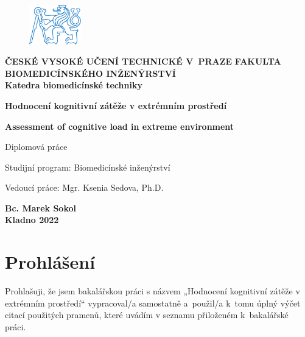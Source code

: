 \documentclass[a4paper,12pt,czech,oneside]{memoir}
\def\uv#1{„#1“}
\numberwithin{equation}{chapter}
\newcommand{\autor}{Bc. Marek Sokol}
\newcommand{\vedouci}{Mgr. Ksenia Sedova, Ph.D.}
\newcommand{\nazev}{Hodnocení kognitivní zátěže v extrémním prostředí}
\newcommand{\nazevENG}{Assessment of cognitive load in extreme environment}
\newcommand{\typ}{Diplomová práce}
\newcommand{\rok}{2022}
\newcommand{\program}{Biomedicínské inženýrství}
\newcommand{\fakulta}{FAKULTA BIOMEDICÍNSKÉHO INŽENÝRSTVÍ}
\newcommand{\cvut}{ČESKÉ VYSOKÉ UČENÍ TECHNICKÉ V~PRAZE}
\newcommand{\katedra}{Katedra biomedicínské techniky}
\begin{document}
\pagestyle{empty}
\begin{titlingpage}
	\begin{center}
		\begin{figure}[!h]
			\centering
			\includegraphics[width=0.2\textwidth]{symbol_cvut_konturova_verze}
		\end{figure}
		\textsf{\large{\textbf{\cvut}}}
		{\color{NavyBlue}\makebox[\linewidth]{\rule[.2\baselineskip]{\textwidth}{0.4mm}}}
		\textsf{\normalsize{\textbf{\fakulta}}}\\

		\textsf{\textbf{\katedra}}

		\vfill

		\textsf{\Large{\textbf{\nazev}}}

		\vspace{36pt}

		\textsf{\Large{\textbf{\nazevENG}}}

		\vspace{48pt}

		\textsf{\typ}

		\vfill

	\end{center}
	\textsf{Studijní program: \program}

	\vspace{12pt}

	\noindent\textsf{Vedoucí práce: \vedouci}

	\vspace{24pt}

	\begin{center}
		\textsf{\textbf{\autor}} \\ [0.5cm]
		{\color{NavyBlue}\makebox[\linewidth]{\rule{\textwidth}{0.4mm}}}
		\textsf{\textbf{Kladno \rok}}
	\end{center}
\end{titlingpage}

% 

\null\vfill
\section*{Prohlášení}
Prohlašuji, že jsem bakalářskou práci s názvem \uv{\nazev} vypracoval/a
samostatně a~použil/a k~tomu úplný výčet citací použitých pramenů, které uvádím
v seznamu přiloženém k~bakalářské práci.
\end{document}
